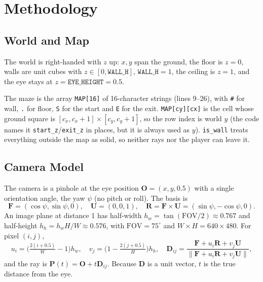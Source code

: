 \chapter{Methodology}


\section{World and Map}

The world is right-handed with $z$ up: $x,y$ span the ground, the floor is $z=0$, walls are unit cubes with $z\in[0,\texttt{WALL\_H}]$, $\texttt{WALL\_H}=1$, the ceiling is $z=1$, and the eye stays at $z=\texttt{EYE\_HEIGHT}=0.5$.

The maze is the array \texttt{MAP[16]} of 16-character strings (lines 9--26), with \texttt{\#} for wall, \texttt{.} for floor, \texttt{S} for the start and \texttt{E} for the exit. \texttt{MAP[cy][cx]} is the cell whose ground square is $[c_x,c_x+1]\times[c_y,c_y+1]$, so the row index is world $y$ (the code names it \texttt{start\_z}/\texttt{exit\_z} in places, but it is always used as $y$). \texttt{is\_wall} treats everything outside the map as solid, so neither rays nor the player can leave it.

\section{Camera Model}

The camera is a pinhole at the eye position $\mathbf{O}=(x,y,0.5)$ with a single orientation angle, the yaw $\psi$ (no pitch or roll). The basis is
\begin{equation}
\mathbf{F}=(\cos\psi,\sin\psi,0),\quad \mathbf{U}=(0,0,1),\quad \mathbf{R}=\mathbf{F}\times\mathbf{U}=(\sin\psi,-\cos\psi,0).
\end{equation}
An image plane at distance 1 has half-width $h_w=\tan(\mathrm{FOV}/2)\approx0.767$ and half-height $h_h=h_w H/W\approx0.576$, with $\mathrm{FOV}=75^\circ$ and $W\times H=640\times480$. For pixel $(i,j)$,
\begin{equation}
u_i=\Big(\tfrac{2(i+0.5)}{W}-1\Big)h_w,\quad
v_j=\Big(1-\tfrac{2(j+0.5)}{H}\Big)h_h,\quad
\mathbf{D}_{ij}=\frac{\mathbf{F}+u_i\mathbf{R}+v_j\mathbf{U}}{\lVert\mathbf{F}+u_i\mathbf{R}+v_j\mathbf{U}\rVert},
\end{equation}
and the ray is $\mathbf{P}(t)=\mathbf{O}+t\mathbf{D}_{ij}$. Because $\mathbf{D}$ is a unit vector, $t$ is the true distance from the eye.

